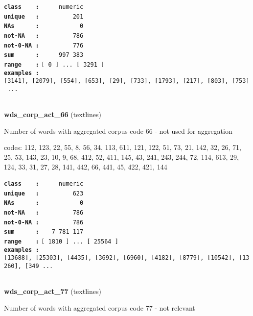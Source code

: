 \documentclass[]{article}
\begin{document}
\textbf{\texttt{class\ \ \ \ :}} \texttt{~~~~~numeric}\\
\textbf{\texttt{unique\ \ \ :}} \texttt{~~~~~~~~~201}\\
\textbf{\texttt{NAs\ \ \ \ \ \ :}} \texttt{~~~~~~~~~~~0}\\
\textbf{\texttt{not-NA\ \ \ :}} \texttt{~~~~~~~~~786}\\
\textbf{\texttt{not-0-NA\ :}} \texttt{~~~~~~~~~776}\\
\textbf{\texttt{sum\ \ \ \ \ \ :}} \texttt{~~~~~997~383}\\
\textbf{\texttt{range\ \ \ \ :}}
\texttt{{[}\ 0\ {]}\ ...\ {[}\ 3291\ {]}}\\
\textbf{\texttt{examples\ :}}
\texttt{{[}3141{]},\ {[}2079{]},\ {[}554{]},\ {[}653{]},\ {[}29{]},\ {[}733{]},\ {[}1793{]},\ {[}217{]},\ {[}803{]},\ {[}753{]}\ ...}\\

~

\textbf{wds\_corp\_act\_66} (textlines)

Number of words with aggregated corpus code 66 - not used for
aggregation

codes: 112, 123, 22, 55, 8, 56, 34, 113, 611, 121, 122, 51, 73, 21, 142,
32, 26, 71, 25, 53, 143, 23, 10, 9, 68, 412, 52, 411, 145, 43, 241, 243,
244, 72, 114, 613, 29, 124, 33, 31, 27, 28, 141, 442, 66, 441, 45, 422,
421, 144

\textbf{\texttt{class\ \ \ \ :}} \texttt{~~~~~numeric}\\
\textbf{\texttt{unique\ \ \ :}} \texttt{~~~~~~~~~623}\\
\textbf{\texttt{NAs\ \ \ \ \ \ :}} \texttt{~~~~~~~~~~~0}\\
\textbf{\texttt{not-NA\ \ \ :}} \texttt{~~~~~~~~~786}\\
\textbf{\texttt{not-0-NA\ :}} \texttt{~~~~~~~~~786}\\
\textbf{\texttt{sum\ \ \ \ \ \ :}} \texttt{~~~7~781~117}\\
\textbf{\texttt{range\ \ \ \ :}}
\texttt{{[}\ 1810\ {]}\ ...\ {[}\ 25564\ {]}}\\
\textbf{\texttt{examples\ :}}
\texttt{{[}13688{]},\ {[}25303{]},\ {[}4435{]},\ {[}3692{]},\ {[}6960{]},\ {[}4182{]},\ {[}8779{]},\ {[}10542{]},\ {[}13260{]},\ {[}349\ ...}\\

~

\textbf{wds\_corp\_act\_77} (textlines)

Number of words with aggregated corpus code 77 - not relevant
\end{document}
